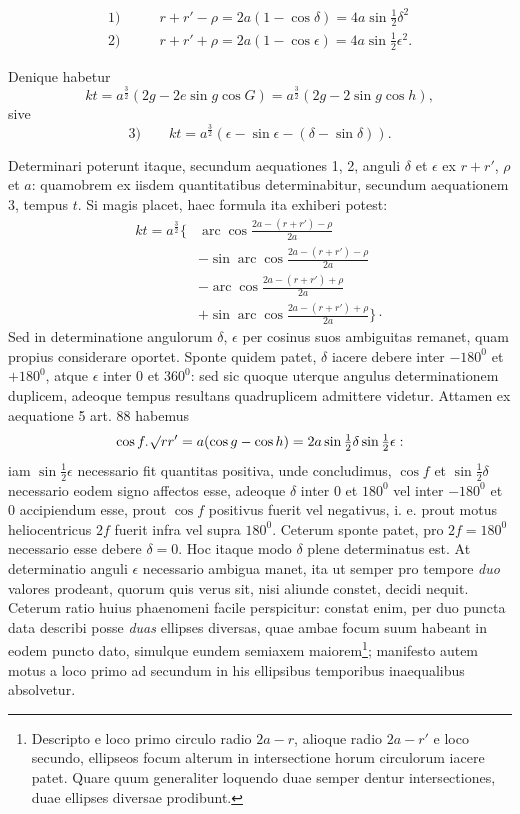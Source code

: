 \[
\begin{aligned}
\mathrm{1)}\qquad&r+r'-\rho=2a(1-\cos\delta)=4a\sin\tfrac12\delta^2\\[.6em]
\mathrm{2)}\qquad&r+r'+\rho=2a(1-\cos\epsilon)=4a\sin\tfrac12\epsilon^2.
\end{aligned}
\]
\par
Denique habetur
\[
kt=a^{\frac32}(2g-2e\sin g\cos G)=a^{\frac32}(2g-2\sin g\cos h),
\]
\noindent{}sive
\[
\mathrm{3)}\qquad kt=a^{\frac32}(\epsilon-\sin\epsilon-(\delta-\sin\delta)).
\]
\par
Determinari poterunt itaque, secundum aequationes 1, 2, anguli $\delta$ et $\epsilon$ ex $r+r'$, $\rho$ et $a$: quamobrem ex iisdem quantitatibus determinabitur, secundum aequationem 3, tempus $t$. Si magis placet, haec formula ita exhiberi potest:
\[
\begin{aligned}
kt=a^{\frac32}\Biggl\{&\operatorname{arc}\cos\frac{2a-(r+r')-\rho}{2a}\\[.6em]
&-\sin\operatorname{arc}\cos\frac{2a-(r+r')-\rho}{2a}\\[.6em]
&-\operatorname{arc}\cos\frac{2a-(r+r')+\rho}{2a}\\[.6em]
&+\sin\operatorname{arc}\cos\frac{2a-(r+r')+\rho}{2a}\Biggr\}\mathpunct{\cdot}
\end{aligned}
\]
\noindent Sed in determinatione angulorum $\delta$, $\epsilon$ per cosinus suos ambiguitas remanet, quam propius considerare oportet. Sponte quidem patet, $\delta$ iacere debere inter $-180^0$ et $+180^0$, atque $\epsilon$ inter 0 et $360^0$: sed sic quoque uterque angulus determinationem duplicem, adeoque tempus resultans quadruplicem admittere videtur. Attamen ex aequatione 5 art. 88 habemus
\[
\cos f\mathpunct{.}\mathord{{}^{}\!\surd}rr'=a(\cos g-\cos h)=2a\sin\tfrac12\delta\sin\tfrac12\epsilon:
\]
\noindent iam $\sin\tfrac12\epsilon$ necessario fit quantitas positiva, unde concludimus, $\cos f$ et $\sin\tfrac12\delta$ necessario eodem signo affectos esse, adeoque $\delta$ inter 0 et $180^0$ vel inter $-180^0$ et 0 accipiendum esse, prout $\cos f$ positivus fuerit vel negativus, i. e. prout motus heliocentricus $2f$ fuerit infra vel supra $180^0$. Ceterum sponte patet, pro $2f=180^0$ necessario esse debere $\delta=0$. Hoc itaque modo $\delta$ plene determinatus est. At determinatio anguli $\epsilon$ necessario ambigua manet, ita ut semper pro tempore \textit{duo} valores prodeant, quorum quis verus sit, nisi aliunde constet, decidi nequit. Ceterum ratio huius phaenomeni facile perspicitur: constat enim, per duo puncta data describi posse \textit{duas} ellipses diversas, quae ambae focum suum habeant in eodem puncto dato, simulque eundem semiaxem maiorem\footnote{Descripto e loco primo circulo radio $2a-r$, alioque radio $2a-r'$ e loco secundo, ellipseos focum alterum in intersectione horum circulorum iacere patet. Quare quum generaliter loquendo duae semper dentur intersectiones, duae ellipses diversae prodibunt.}; manifesto autem motus a loco primo ad secundum in his ellipsibus temporibus inaequalibus absolvetur.
